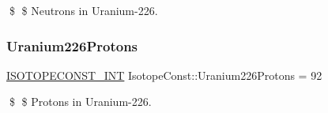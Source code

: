 \$ \$ Neutrons in Uranium-\/226. \mbox{\label{group___isotope_const-_uranium-_u226_ga41645f58808881c921c5502d6a88c326}} 
\subsubsection{\texorpdfstring{Uranium226\+Protons}{Uranium226Protons}}
{\footnotesize\ttfamily \mbox{\hyperlink{group___isotope_const-_macros_ga5f18360b3e99483a35c32d789e62621c}{I\+S\+O\+T\+O\+P\+E\+C\+O\+N\+S\+T\+\_\+\+I\+NT}} Isotope\+Const\+::\+Uranium226\+Protons = 92}

\$ \$ Protons in Uranium-\/226. 